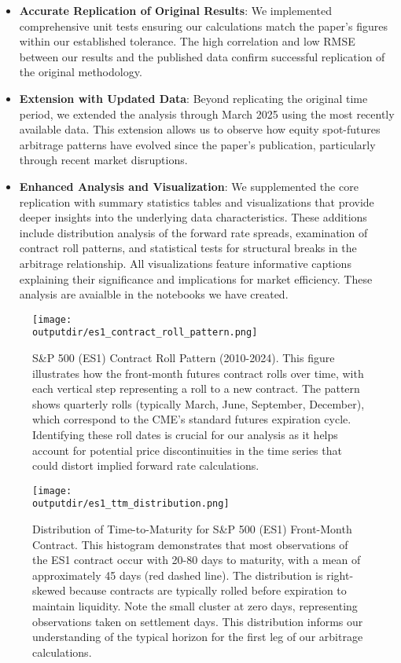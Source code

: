 \documentclass{article}
\newcommand{\outputdir}{../_output}
\begin{document}
\begin{itemize}
    \item \textbf{Accurate Replication of Original Results}: We implemented comprehensive unit tests ensuring our calculations match the paper's figures within our established tolerance. The high correlation and low RMSE between our results and the published data confirm successful replication of the original methodology.

    \item \textbf{Extension with Updated Data}: Beyond replicating the original time period, we extended the analysis through March 2025 using the most recently available data. This extension allows us to observe how equity spot-futures arbitrage patterns have evolved since the paper's publication, particularly through recent market disruptions.

    \item \textbf{Enhanced Analysis and Visualization}: We supplemented the core replication with summary statistics tables and visualizations that provide deeper insights into the underlying data characteristics. These additions include distribution analysis of the forward rate spreads, examination of contract roll patterns, and statistical tests for structural breaks in the arbitrage relationship. All visualizations feature informative captions explaining their significance and implications for market efficiency. These analysis are avaialble in the notebooks we have created.
\end{itemize}

\begin{figure}[H]
  \centering
  \texttt{[image: \\outputdir/es1\_contract\_roll\_pattern.png]}
  \caption{S\&P 500 (ES1) Contract Roll Pattern (2010-2024). This figure illustrates how the front-month futures contract rolls over time, with each vertical step representing a roll to a new contract. The pattern shows quarterly rolls (typically March, June, September, December), which correspond to the CME's standard futures expiration cycle. Identifying these roll dates is crucial for our analysis as it helps account for potential price discontinuities in the time series that could distort implied forward rate calculations.}
  \label{fig:es1_roll_pattern}
\end{figure}

\begin{figure}[H]
  \centering
  \texttt{[image: \\outputdir/es1\_ttm\_distribution.png]}
  \caption{Distribution of Time-to-Maturity for S\&P 500 (ES1) Front-Month Contract. This histogram demonstrates that most observations of the ES1 contract occur with 20-80 days to maturity, with a mean of approximately 45 days (red dashed line). The distribution is right-skewed because contracts are typically rolled before expiration to maintain liquidity. Note the small cluster at zero days, representing observations taken on settlement days. This distribution informs our understanding of the typical horizon for the first leg of our arbitrage calculations.}
  \label{fig:es1_ttm_distribution}
\end{figure}
\end{document}
